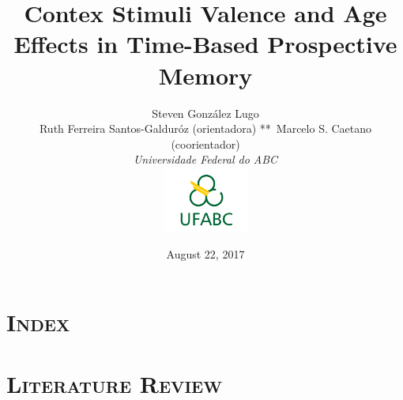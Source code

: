 \documentclass[xcolor=x11names,compress]{beamer}
\renewcommand{\(}{\begin{columns}}
\renewcommand{\)}{\end{columns}}
\newcommand{\<}[1]{\begin{column}{#1}}
\renewcommand{\>}{\end{column}}
\begin{document}
\section{\scshape Index}
\begin{frame}
\title{Contex Stimuli Valence and Age Effects in Time-Based Prospective Memory}
\author{
	Steven Gonz\'{a}lez Lugo\\ {\tiny Ruth Ferreira Santos-Galdur\'{o}z (orientadora) **\ Marcelo S. Caetano (coorientador)}\\
	{\it Universidade Federal do ABC
	}\\ \includegraphics[width=2.8cm]{sigla-abaixo-rgb.png}
}
\date{August 22, 2017}
\titlepage
\end{frame}

\begin{frame}
\tableofcontents
\end{frame}

\section{\scshape Literature Review}
\end{document}
